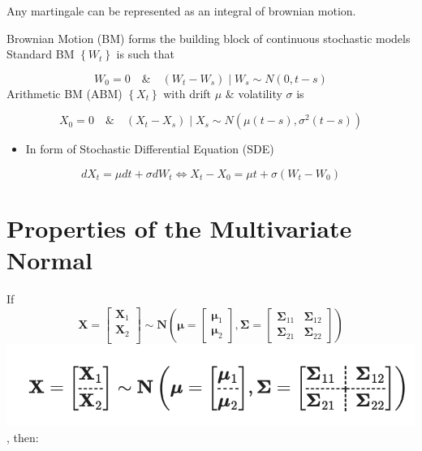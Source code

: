 \documentclass[
  oneside]{book}
\providecommand{\tightlist}{%
  \setlength{\itemsep}{0pt}\setlength{\parskip}{0pt}}
\begin{document}
Any martingale can be represented as an integral of brownian motion.

Brownian Motion (BM) forms the building block of continuous stochastic models
Standard BM \(\left\{W_t\right\}\) is such that

\[
W_0=0 \quad \& \quad (W_t-W_s) \mid W_s \sim N(0, t-s)
\]
Arithmetic BM (ABM) \(\left\{X_t\right\}\) with drift \(\mu\) \& volatility \(\sigma\) is

\[
X_0=0 \quad \& \quad \left(X_t-X_s\right) \mid X_s \sim N\left(\mu(t-s), \sigma^2(t-s)\right)
\]

\begin{itemize}
\tightlist
\item
  In form of Stochastic Differential Equation (SDE)
\end{itemize}

\[
d X_t=\mu d t+\sigma d W_t \Leftrightarrow X_t-X_0=\mu t+\sigma\left(W_t-W_0\right)
\]

\hypertarget{properties-of-the-multivariate-normal}{%
\section{Properties of the Multivariate Normal}\label{properties-of-the-multivariate-normal}}

If
\[
\mathbf{X}=\left[
\begin{array}{c}
\mathbf{X}_1 \\
\mathbf{X}_2 \\
\end{array}
\right] 
\sim \mathbf{N}\left(\boldsymbol{\mu}=\left[
\begin{array}{c} 
\boldsymbol{\mu}_1 \\
\boldsymbol{\mu}_2
\end{array}
\right],
\boldsymbol{\Sigma}=\left[
\begin{array}{cc}
\boldsymbol{\Sigma}_{11} & \boldsymbol{\Sigma}_{12} \\ 
\boldsymbol{\Sigma}_{21} & \boldsymbol{\Sigma}_{22} 
\end{array}\right]
\right)
\]
\includegraphics{Notes/Obsidian-Attachments/10-Simulation-3.png}, then:
\end{document}
